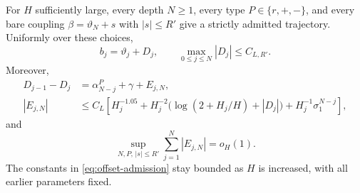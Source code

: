 \begin{proposition}
\label{prop:admission}
For $H$ sufficiently large, every depth $N\ge1$, every type
$P\in\{r,+,-\}$, and every bare coupling
$\beta=\vartheta_N+s$ with $|s|\le R'$ give a strictly admitted
trajectory.  Uniformly over these choices,
\begin{equation}
 b_j=\vartheta_j+D_j,\qquad
 \max_{0\le j\le N}|D_j|\le C_{L,R'}.
 \label{eq:offset-admission}
\end{equation}
Moreover,
\begin{align}
 D_{j-1}-D_j&=\alpha^P_{N-j}+\gamma+E_{j,N},\nonumber\\
 |E_{j,N}|&\le C_L\left[
 H_j^{-1.05}
 +H_j^{-2}\bigl(\log(2+H_j/H)+|D_j|\bigr)
 +H_j^{-1}\sigma_1^{N-j}\right],
 \label{eq:offset-error-recursion}
\end{align}
and
\begin{equation}
 \sup_{N,P,\,|s|\le R'}\sum_{j=1}^{N}|E_{j,N}|
       =o_H(1).
 \label{eq:offset-error-sum}
\end{equation}
The constants in \eqref{eq:offset-admission} stay bounded as $H$
is increased, with all earlier parameters fixed.
\end{proposition}

